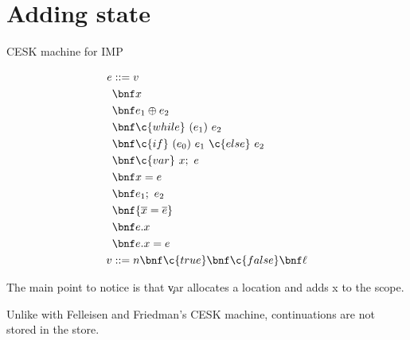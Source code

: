 \section{Adding state}

CESK machine for IMP

\begin{align*}
    e &::= v \\
        & \bnf x \\
        & \bnf e_1 \oplus e_2 \\
        & \bnf \c{while}~(e_1)~e_2 \\
        & \bnf \c{if}~(e_0)~e_1~\c{else}~e_2 \\
        & \bnf \c{var}~x;~e \\
        & \bnf x = e \\
        & \bnf e_1;~e_2 \\
        & \bnf \{ \overline{x} = \overline{e} \} \\
        & \bnf e.x \\
        & \bnf e.x = e \\
    v &::= n \bnf \c{true} \bnf \c{false} \bnf \ell
\end{align*}

The main point to notice is that \c{var} allocates a location and
adds x to the scope.

Unlike with Felleisen and Friedman's CESK machine, continuations
are not stored in the store.

\newcommand\then[2]{(\bullet;~#1, #2)}
\newcommand\branch[3]{(\c{if}~(\bullet)~#1~\c{else}~#2, #3)}
\newcommand\init[3]{(\bullet.#1 = #2, #3)}

\newcommand{\residual}[1]{\langle\!\langle{#1}\rangle\!\rangle}


